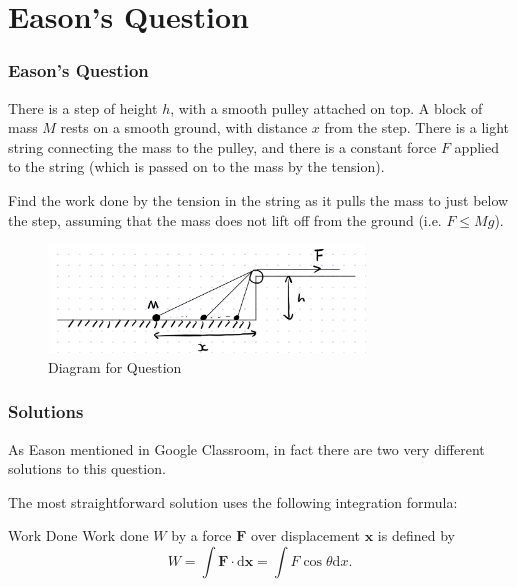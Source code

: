 \documentclass{beamer}
\begin{document}
    \section{Eason's Question}
        \begin{frame}
            \frametitle{Eason's Question}
            
            There is a step of height $h$, with a smooth pulley attached on top. A block of mass $M$ rests on a smooth ground, with distance $x$ from the step. There is a light string connecting the mass to the pulley, and there is a constant force $F$ applied to the string (which is passed on to the mass by the tension).\pause
            
            Find the work done by the tension in the string as it pulls the mass to just below the step, assuming that the mass does not lift off from the ground (i.e. $F \leq Mg$).\pause

            \begin{figure}
                \centering
                \includegraphics[width=0.75\textwidth]{Diagram.jpg}
                \caption{Diagram for Question}
                \label{fig:MyQ}
            \end{figure}
        \end{frame}

        \begin{frame}
            \frametitle{Solutions}

            As Eason mentioned in Google Classroom, in fact there are two very different solutions to this question.\pause

            The most straightforward solution uses the following integration formula:\pause
            \begin{alertblock}{Work Done}
                Work done $W$ by a force $\mathbf{F}$ over displacement $\mathbf{x}$ is defined by
                $$
                W = \int \mathbf{F} \cdot \mathrm{d} \mathbf{x} = \int F \cos \theta \mathrm{d} x.
                $$
            \end{alertblock}
        \end{frame}
\end{document}
